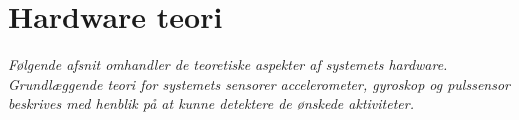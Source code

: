 \section{Hardware teori}
\textit{Følgende afsnit omhandler de teoretiske aspekter af systemets hardware. Grundlæggende teori for systemets sensorer accelerometer, gyroskop og pulssensor beskrives med henblik på at kunne detektere de ønskede aktiviteter.}

